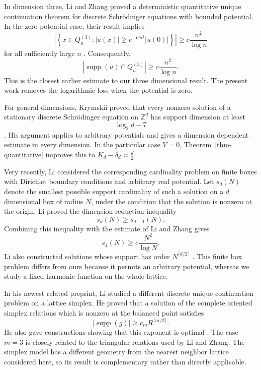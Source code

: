 \documentclass[11pt,reqno]{amsart}
\newcommand\Z{\ensuremath{\mathbb{Z}}}
\newcommand{\supp}{\operatorname{supp}}
\theoremstyle{definition}
\theoremstyle{plain}
\numberwithin{equation}{section}
\begin{document}
In dimension three, Li and Zhang proved a deterministic quantitative
unique continuation theorem for discrete Schr\"odinger equations with
bounded potential. In the zero potential case, their result implies
\begin{equation*}
    \left|
        \left\{
            x\in Q_n^{(3)}:
            |u(x)|\geq e^{-Cn^3}|u(0)|
        \right\}
    \right|
    \geq c\frac{n^2}{\log n}
\end{equation*}
for all sufficiently large $n$ \cite{LiZhang2022}. Consequently,
\begin{equation*}
    \left|\supp(u)\cap Q_n^{(3)}\right|
    \geq c\frac{n^2}{\log n}.
\end{equation*}
This is the closest earlier estimate to our three dimensional result.
The present work removes the logarithmic loss when the potential is zero.

For general dimensions, Krymskii proved that every nonzero solution of a
stationary discrete Schr\"odinger equation on $\Z^d$ has support dimension
at least
\begin{equation*}
    \log_2 d-7
\end{equation*}
\cite{Krymskii}. His argument applies to arbitrary potentials and gives a
dimension dependent estimate in every dimension.  In the particular case $V=0$, Theorem~\ref{thm-quantitative} improves this to $K_d-\delta_d\asymp \frac{d}{2}$.

Very recently, Li considered the corresponding cardinality problem on
finite boxes with Dirichlet boundary conditions and arbitrary real
potential. Let $s_d(N)$ denote the smallest possible support cardinality
of such a solution on a $d$ dimensional box of radius $N$, under the
condition that the solution is nonzero at the origin. Li proved the
dimension reduction inequality
\begin{equation*}
    s_d(N)\geq s_{d-1}(N).
\end{equation*}
Combining this inequality with the estimate of Li and Zhang gives
\begin{equation*}
    s_4(N)\geq c\frac{N^2}{\log N}.
\end{equation*}
Li also constructed solutions whose support has order
$N^{\lceil d/2\rceil}$ \cite{LiSupport2026}. This finite box problem
differs from ours because it permits an arbitrary potential, whereas we
study a fixed harmonic function on the whole lattice.

In his newest related preprint, Li studied a different discrete unique
continuation problem on a lattice simplex. He proved that a solution of
the complete oriented simplex relations which is nonzero at the balanced
point satisfies
\begin{equation*}
    |\supp(g)|\geq c_m R^{\lceil m/2\rceil}.
\end{equation*}
He also gave constructions showing that this exponent is optimal
\cite{LiSimplex2026}. The case $m=3$ is closely related to the triangular
relations used by Li and Zhang. The simplex model has a different
geometry from the nearest neighbor lattice considered here, so its result
is complementary rather than directly applicable.
\end{document}
